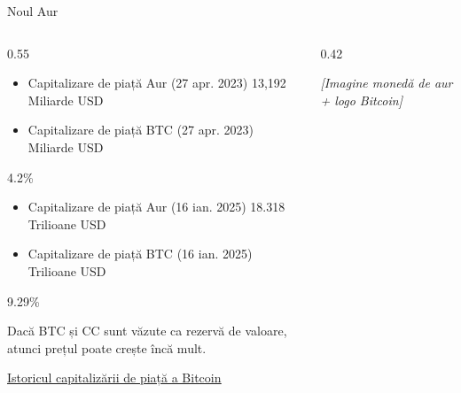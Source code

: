 \documentclass[9pt, aspectratio=169, t]{beamer}
\theoremstyle{definition}
\begin{document}
\begin{frame}{Noul Aur}
\begin{columns}[T]
\begin{column}{0.55\textwidth}
\begin{itemize}
    \item Capitalizare de piață Aur (27 apr. 2023) 13,192 Miliarde USD
    \item Capitalizare de piață BTC (27 apr. 2023)  Miliarde USD
\end{itemize}

\hfill{\small 4.2\%}

\vspace{0.3cm}

\begin{itemize}
    \item Capitalizare de piață Aur (16 ian. 2025) 18.318 Trilioane USD
    \item Capitalizare de piață BTC (16 ian. 2025)  Trilioane USD
\end{itemize}

\hfill{\small 9.29\%}

\vspace{0.3cm}

Dacă BTC și CC sunt văzute ca rezervă de valoare, atunci prețul poate crește încă mult.

\vspace{0.2cm}

{\small \href{https://companiesmarketcap.com/bitcoin/marketcap/}{\underline{Istoricul capitalizării de piață a Bitcoin}}}
\end{column}
\begin{column}{0.42\textwidth}
\begin{center}
    {\small\textit{[Imagine monedă de aur + logo Bitcoin]}}
\end{center}
\end{column}
\end{columns}
\end{frame}
\end{document}
